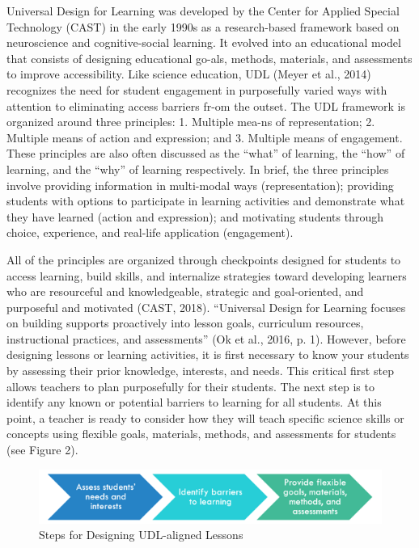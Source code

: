 \documentclass[11.5pt]{sig-alternate}
\begin{document}
\begin{large}
Universal Design for Learning was developed by the Center for Applied Special Technology (CAST) in the early 1990s as a research-based framework based on neuroscience and cognitive-social learning. It evolved into an educational model that consists of designing educational go-als, methods, materials, and assessments to improve accessibility. Like science education, UDL (Meyer et al., 2014) recognizes the need for student engagement in purposefully varied ways with attention to eliminating access barriers fr-om the outset. The UDL framework is organized around three principles: 1. Multiple mea-ns of representation; 2. Multiple means of action and expression; and 3. Multiple means of engagement. These principles are also often discussed as the “what” of learning, the “how” of learning, and the “why” of learning respectively. In brief, the three principles involve providing information in multi-modal ways (representation); providing students with options to participate in learning activities and demonstrate what they have learned (action and expression); and motivating students through choice, experience, and real-life application (engagement). 

All of the principles are organized through checkpoints designed for students to access learning, build skills, and internalize strategies toward developing learners who are resourceful and knowledgeable, strategic and goal-oriented, and purposeful and motivated (CAST, 2018). “Universal Design for Learning focuses on building supports proactively into lesson goals, curriculum resources, instructional practices, and assessments” (Ok et al., 2016, p. 1). However, before designing lessons or learning activities, it is first necessary to know your students by assessing their prior knowledge, interests, and needs. This critical first step allows teachers to plan purposefully for their students. The next step is to identify any known or potential barriers to learning for all students. At this point, a teacher is ready to consider how they will teach specific science skills or concepts using flexible goals, materials, methods, and assessments for students (see Figure 2).

\begin{figure}[t]
    \centering
    \includegraphics[width=1\linewidth]{fig2.png}
    \caption{Steps for Designing UDL-aligned Lessons}
\end{figure}


\end{large}
\end{document}
